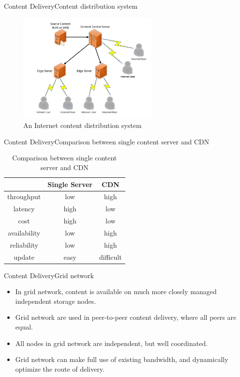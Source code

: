 \documentclass{beamer}
\begin{document}
  \begin{frame}{Content Delivery}{Content distribution system}
    \begin{figure}
        \includegraphics[width = 7cm]{cds_sample.pdf}
        \caption{An Internet content distribution system}
    \end{figure}
  \end{frame}
  
  \begin{frame}{Content Delivery}{Comparison between single content server and CDN}
    \begin{center}
    \begin{table}
    \begin{tabular}{c|cc}
      \hline
        &  Single Server & CDN \\ \hline
      throughput & low & high \\
      latency & high & low \\
      cost & high & low \\
      availability & low & high \\
      reliability & low & high \\
      update & easy & difficult \\ \hline
    \end{tabular}
    \caption{Comparison between single content server and CDN}
    \end{table}
    \end{center}
  \end{frame}

  \begin{frame}{Content Delivery}{Grid network}
    \begin{itemize}[<+->]
      \item In grid network, content is available on much more closely managed independent storage nodes.
      \item Grid network are used in peer-to-peer content delivery, where all peers are equal.
      \item All nodes in grid network are independent, but well coordinated.
      \item Grid network can make full use of existing bandwidth, and dynamically optimize the route of delivery.
    \end{itemize}
  \end{frame}
\end{document}
